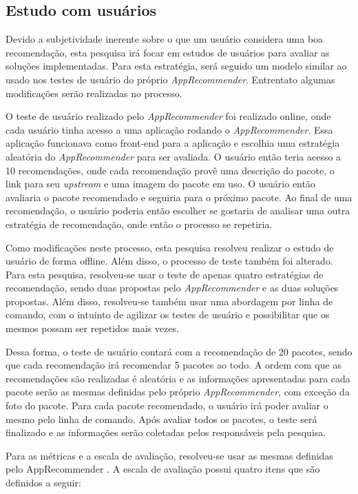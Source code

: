 \subsection{Estudo com usuários}\label{sec:estudo_usuario}

Devido a subjetividade inerente sobre o que um usuário considera uma boa
recomendação, esta pesquisa irá focar em estudos de usuários para
avaliar as soluções implementadas. Para esta estratégia, será seguido um modelo
similar ao usado nos testes de usuário do próprio \textit{AppRecommender}. Entrentato
algumas modificações serão realizadas no processo.

O teste de usuário realizado pelo \textit{AppRecommender} foi realizado online, onde cada
usuário tinha acesso a uma aplicação rodando o \textit{AppRecommender}. Essa aplicação
funcionava como front-end para a aplicação e escolhia uma estratégia aleatória
do \textit{AppRecommender} para ser avaliada. O usuário então teria acesso a 10
recomendações, onde cada recomendação provê uma descrição do
pacote, o link para seu \textit{upstream} e uma imagem do pacote em uso. O
usuário então avaliaria o pacote recomendado e seguiria para o próximo pacote.
Ao final de uma recomendação, o usuário poderia então escolher se gostaria de
analisar uma outra estratégia de recomendação, onde então o processo se
repetiria.

Como modificações neste processo, esta pesquisa resolveu realizar o estudo de
usuário de forma offline. Além disso, o processo de teste também foi alterado.
Para esta pesquisa, resolveu-se usar o teste de apenas quatro estratégias de
recomendação, sendo duas propostas pelo \textit{AppRecommender} e as duas soluções
propostas. Além disso, resolveu-se também usar uma abordagem por linha de
comando, com o intuinto de agilizar os testes de usuário e possibilitar que os
mesmos possam ser repetidos mais vezes.

Dessa forma, o teste de usuário contará com a recomendação de 20 pacotes,
sendo que cada recomendação irá recomendar 5 pacotes ao todo. A ordem com que
as recomendações são realizadas é aleatória e as informações apresentadas
para cada pacote serão as mesmas definidas pelo próprio \textit{AppRecommender}, com
exceção da foto do pacote. Para cada pacote recomendado, o usuário irá poder
avaliar o mesmo pelo linha de comando. Após avaliar todos os pacotes, o teste
será finalizado e as informações serão coletadas pelos responsáveis pela
pesquisa.

Para as métricas e a escala de avaliação, resolveu-se usar as mesmas definidas
pelo AppRecommender \cite{araujo2011apprecommender}. A escala de avaliação
possui quatro itens que são definidos a seguir:

